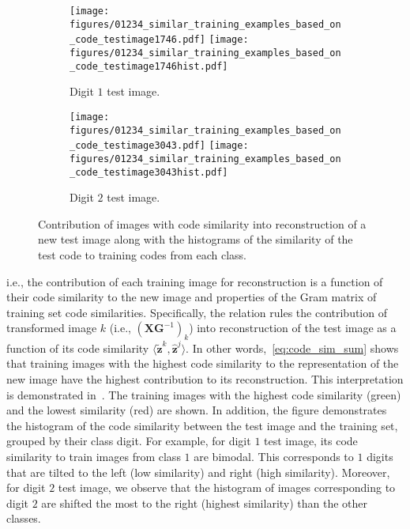 \documentclass[10pt]{article} %
\newcommand{\Xx}{{\bm X}}
\newcommand{\G}{{\bm G}}
\newcommand{\z}{{\bm z}}
\begin{document}
\begin{figure}[h]
  \centering
  \begin{subfigure}[b]{0.49\textwidth}
  \centering
  \texttt{[image: figures/01234\_similar\_training\_examples\_based\_on\_code\_testimage1746.pdf]}
   \texttt{[image: figures/01234\_similar\_training\_examples\_based\_on\_code\_testimage1746hist.pdf]}
  \caption{Digit $1$ test image.}
  \vspace*{-2mm}
  \end{subfigure}
  \begin{subfigure}[b]{0.49\textwidth}
  \centering
  \texttt{[image: figures/01234\_similar\_training\_examples\_based\_on\_code\_testimage3043.pdf]}
   \texttt{[image: figures/01234\_similar\_training\_examples\_based\_on\_code\_testimage3043hist.pdf]}
  \caption{Digit $2$ test image.}
  \vspace*{-2mm}
  \end{subfigure}
  \caption{Contribution of images with code similarity into reconstruction of a new test image along with the histograms of the similarity of the test code to training codes from each class.}
  \label{fig:mnist_01234_learn_interpolate_code_sim}
  \vspace{-4mm}
\end{figure}
%
i.e., the contribution of each training image for reconstruction is a function of their code similarity to the new image and properties of the Gram matrix of training set code similarities. Specifically, the relation rules the contribution of transformed image $k$ (i.e., $(\Xx \G^{-1})_k$) into reconstruction of the test image as a function of its code similarity $\langle \tilde \z^{k}, \hat \z^j \rangle$. In other words,~\eqref{eq:code_sim_sum} shows that training images with the highest code similarity to the representation of the new image have the highest contribution to its reconstruction. This interpretation is demonstrated in~. The training images with the highest code similarity (green) and the lowest similarity (red) are shown. In addition, the figure demonstrates the histogram of the code similarity between the test image and the training set, grouped by their class digit. For example, for digit $1$ test image, its code similarity to train images from class $1$ are bimodal. This corresponds to $1$ digits that are tilted to the left (low similarity) and right (high similarity). Moreover, for digit $2$ test image, we observe that the histogram of images corresponding to digit $2$ are shifted the most to the right (highest similarity) than the other classes.
%
\end{document}
